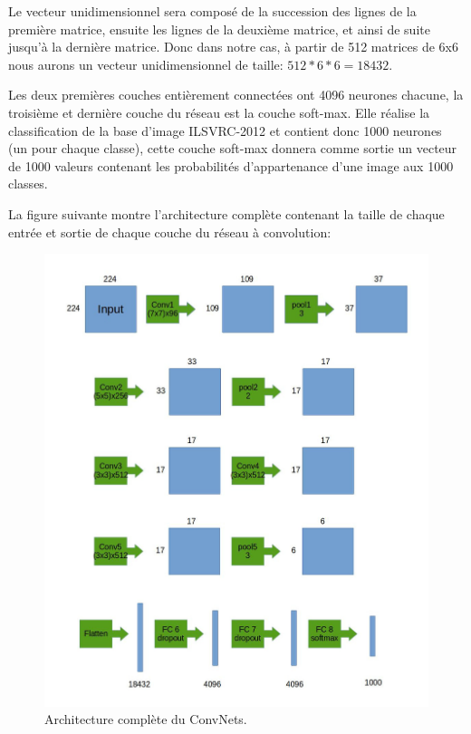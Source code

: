 	Le vecteur unidimensionnel sera composé de la succession des lignes de la première matrice, ensuite les lignes de la deuxième matrice, et ainsi de suite jusqu'à la dernière matrice. Donc dans notre cas, à partir de 512 matrices de 6x6 nous aurons un vecteur unidimensionnel de taille: $512*6*6 = 18432$.

Les deux premières couches entièrement connectées ont 4096 neurones chacune, la troisième et dernière couche du réseau est la couche soft-max. Elle réalise la classification de la base d'image ILSVRC-2012 et contient donc 1000 neurones (un pour chaque classe), cette couche soft-max donnera comme sortie un vecteur de 1000 valeurs contenant les probabilités d'appartenance d'une image aux 1000 classes.

	La figure suivante montre l'architecture complète contenant la taille de chaque entrée et sortie de chaque couche du réseau à convolution:

\begin{figure}[H]
	\centering
		\includegraphics[width=6in]{Figures/architectureVGG.jpg}
	\caption[An Electron]{Architecture complète du ConvNets.}
	\label{fig:Electron}
\end{figure}



